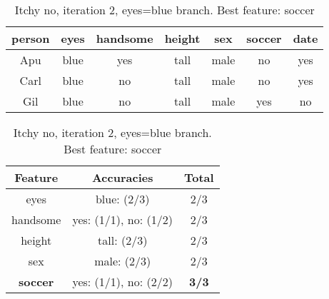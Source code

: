 \begin{table}[h!]
  \centering
  \begin{tabular}{cccccc|c}
    \toprule
    person      & eyes  & handsome & height & sex    & soccer & date\\
    \midrule
    Apu         & blue  & yes      & tall   & male   & no     & yes \\
    Carl        & blue  & no       & tall   & male   & no     & yes \\
    Gil         & blue  & no       & tall   & male   & yes    & no  \\
    \bottomrule
  \end{tabular}

  \vspace{.5cm}

  \begin{tabular}{ccc}
    \toprule
    Feature         & Accuracies                              & Total\\
    \midrule
    eyes            & blue: (2/3)                             & 2/3\\
    handsome        & yes: (1/1), no: (1/2)                   & 2/3\\
    height          & tall: (2/3)                             & 2/3\\
    sex             & male: (2/3)                             & 2/3\\
    \textbf{soccer} & yes: (1/1), no: (2/2)                   & \textbf{3/3}\\
    \bottomrule
  \end{tabular}
  \caption*{Itchy no, iteration 2, eyes=blue branch. Best feature: soccer}
\end{table}
